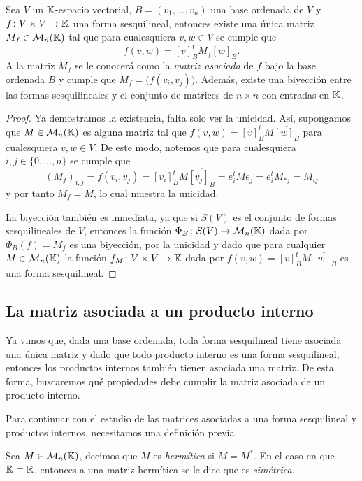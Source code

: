 \begin{teor}\label{teor:MAsocFS}
  Sea $V$ un $\mathbb{K}$-espacio vectorial, $B = (v_1,\ldots,v_n)$ una base ordenada de $V$ y $f\colon V\times V \to\mathbb{K}$ una forma sesquilineal, entonces existe una única matriz $M_f \in \mathcal{M}_n(\mathbb{K})$ tal que para cualesquiera $v,w \in V$ se cumple que
    \[
      f(v,w) =  [v]_B^t M_f \overline{[w]_B}.
    \]
    A la matriz $M_f$ se le conocerá como la \emph{matriz asociada} de $f$ bajo la base ordenada $B$ y cumple que $M_f = \bigl(f(v_i,v_j)\bigr)$. Además, existe una biyección entre las formas sesquilineales y el conjunto de matrices de $n\times n$ con entradas en $\mathbb{K}$.
\end{teor}
\begin{proof}
  Ya demostramos la existencia, falta solo ver la unicidad. Así, supongamos que $M \in \mathcal{M}_n(\mathbb{K})$ es alguna matriz tal que $f(v,w) =  [v]_B^t M \overline{[w]_B}$ para cualesquiera $v,w \in V$. De este modo, notemos que para cualesquiera $i,j \in \{0,\ldots,n\}$ se cumple que
    \[
      (M_f)_{i,j} = f(v_i,v_j) = [v_i]_B^t M \overline{[v_j]_B} = e_i^t M e_j = e_i^t M_{*j} = M_{ij}
    \]
  y por tanto $M_f = M$, lo cual muestra la unicidad.
  
  La biyección también es inmediata, ya que si $S(V)$ es el conjunto de formas sesquilineales de $V$, entonces la función $\Phi_B\colon S(V) \to \mathcal{M}_n(\mathbb{K})$ dada por $\Phi_B(f) = M_f$ es una biyección, por la unicidad y dado que para cualquier $M\in\mathcal{M}_n(\mathbb{K})$ la función $f_M\colon V\times V \to \mathbb{K}$ dada por $f(v,w) = [v]_B^t M \overline{[w]_B}$ es una forma sesquilineal.
\end{proof}

\subsection{La matriz asociada a un producto interno}

Ya vimos que, dada una base ordenada, toda forma sesquilineal tiene asociada una única matriz y dado que todo producto interno es una forma sesquilineal, entonces los productos internos también tienen asociada una matriz. De esta forma, buscaremos qué propiedades debe cumplir la matriz asociada de un producto interno.

Para continuar con el estudio de las matrices asociadas a una forma sesquilineal y productos internos, necesitamos una definición previa.

\begin{defi}
  Sea $M \in \mathcal{M}_n(\mathbb{K})$, decimos que $M$ es \emph{hermítica} si $M = M^*$. En el caso en que $\mathbb{K} = \mathbb{R}$, entonces a una matriz hermítica se le dice que es \emph{simétrica}.
\end{defi}

